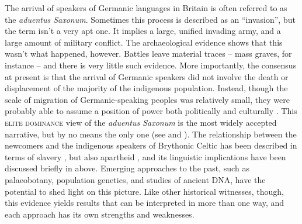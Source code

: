 The arrival of speakers of Germanic languages in Britain is often referred to as the \emph{aduentus Saxonum}. Sometimes this process is described as an ``invasion'', but the term isn't a very apt one. It implies a large, unified invading army, and a large amount of military conflict. The archaeological evidence shows that this wasn't what happened, however. Battles leave material traces -- mass graves, for instance -- and there is very little such evidence. More importantly, the consensus at present is that the arrival of Germanic speakers did not involve the death or displacement of the majority of the indigenous population. Instead, though the scale of migration of Germanic-speaking peoples was relatively small, they were probably able to assume a position of power both politically and culturally \citep[103--105]{Higham2013}. This \textsc{elite dominance} view of the \emph{aduentus Saxonum} is the most widely accepted narrative, but by no means the only one (see \citealp{Fleming2010} and \citealp{Oosthuizen2019}). The relationship between the newcomers and the indigenous speakers of Brythonic Celtic has been described in terms of slavery \citep{Pelteret1995}, but also apartheid \citep{Woolf2007}, and its linguistic implications have been discussed briefly in  above. Emerging approaches to the past, such as palaeobotany, population genetics, and studies of ancient DNA, have the potential to shed light on this picture. Like other historical witnesses, though, this evidence yields results that can be interpreted in more than one way, and each approach has its own strengths and weaknesses.


